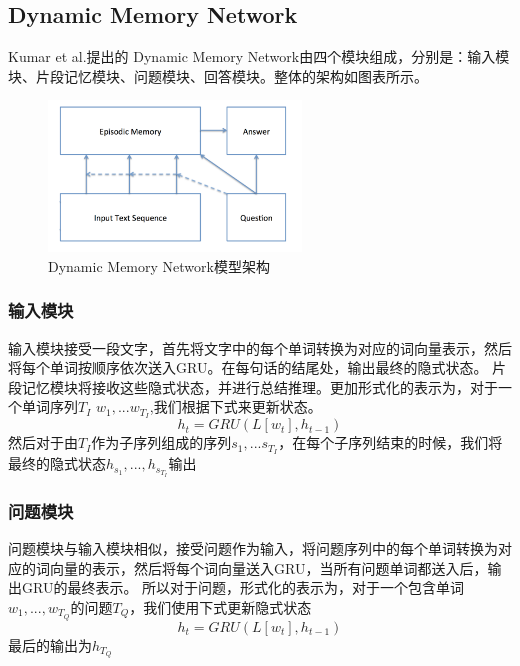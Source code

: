 \subsection{Dynamic Memory Network}
Kumar et al.\cite{DBLP:journals/corr/KumarISBEPOGS15}提出的 Dynamic Memory Network由四个模块组成，分别是：输入模块、片段记忆模块、问题模块、回答模块。整体的架构如图表所示。\\
\begin{figure}[h]
      \centering
        \includegraphics[width=0.6\textwidth]{./images/dynamic-memory-network-structure}
          \caption{Dynamic Memory Network模型架构}
      \end{figure} 
\subsubsection{输入模块}
输入模块接受一段文字，首先将文字中的每个单词转换为对应的词向量表示，然后将每个单词按顺序依次送入GRU。在每句话的结尾处，输出最终的隐式状态。
片段记忆模块将接收这些隐式状态，并进行总结推理。更加形式化的表示为，对于一个单词序列$T_I$ $w_1,...w_{T_I}$,我们根据下式来更新状态。\\
\begin{equation}
h_t = GRU(L[w_t],h_{t-1})
\end{equation}
然后对于由$T_I$作为子序列组成的序列$s_1,...s_{T_I}$，在每个子序列结束的时候，我们将最终的隐式状态$h_{s_1},...,h_{s_{T_I}}$输出
\subsubsection{问题模块}
问题模块与输入模块相似，接受问题作为输入，将问题序列中的每个单词转换为对应的词向量的表示，然后将每个词向量送入GRU，当所有问题单词都送入后，输出GRU的最终表示。
所以对于问题，形式化的表示为，对于一个包含单词$w_1,...,w_{T_Q}$的问题$T_Q$，我们使用下式更新隐式状态\\
\begin{equation}
h_t = GRU(L[w_t],h_{t-1})
\end{equation}
最后的输出为$h_{T_Q}$
